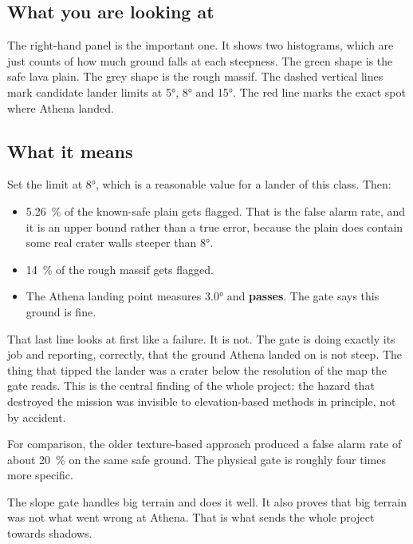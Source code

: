 \documentclass[11pt]{article}
\begin{document}
\subsection{What you are looking at}

The right-hand panel is the important one. It shows two histograms, which are just
counts of how much ground falls at each steepness. The green shape is the safe lava
plain. The grey shape is the rough massif. The dashed vertical lines mark candidate
lander limits at \ang{5}, \ang{8} and \ang{15}. The red line marks the exact spot
where Athena landed.

\subsection{What it means}

Set the limit at \ang{8}, which is a reasonable value for a lander of this class.
Then:

\begin{itemize}
\item \SI{5.26}{\percent} of the known-safe plain gets flagged. That is the false
alarm rate, and it is an upper bound rather than a true error, because the plain does
contain some real crater walls steeper than \ang{8}.
\item \SI{14}{\percent} of the rough massif gets flagged.
\item The Athena landing point measures \ang{3.0} and \textbf{passes}. The gate says
this ground is fine.
\end{itemize}

That last line looks at first like a failure. It is not. The gate is doing exactly its
job and reporting, correctly, that the ground Athena landed on is not steep. The thing
that tipped the lander was a crater below the resolution of the map the gate reads.
This is the central finding of the whole project: the hazard that destroyed the
mission was invisible to elevation-based methods in principle, not by accident.

For comparison, the older texture-based approach produced a false alarm rate of about
\SI{20}{\percent} on the same safe ground. The physical gate is roughly four times
more specific.

\begin{keepbox}
The slope gate handles big terrain and does it well. It also proves that big terrain
was not what went wrong at Athena. That is what sends the whole project towards
shadows.
\end{keepbox}
\end{document}
